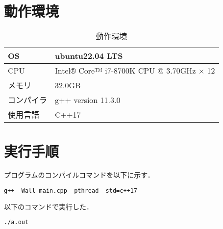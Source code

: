 \documentclass[a4paper,dvipdfmx]{jsarticle}
\begin{document}
\section{動作環境}
    \begin{table}[hbtp]
        \caption{動作環境}
        \label{table:env}
        \centering
        \begin{tabular}{|l|l|}
        \hline \hline
        OS  & ubuntu22.04 LTS\\\hline
        CPU  & Intel® Core™ i7-8700K CPU @ 3.70GHz × 12\\\hline
        メモリ  & 32.0GB \\\hline
        コンパイラ  &  g++ version 11.3.0\\\hline
        使用言語  &  C++17\\
        \hline \hline
        \end{tabular}
    \end{table}

\section{実行手順}
    プログラムのコンパイルコマンドを以下に示す．
    \begin{lstlisting}[caption=コンパイル,label=build]
        g++ -Wall main.cpp -pthread -std=c++17
    \end{lstlisting}\par
    以下のコマンドで実行した．
    \begin{lstlisting}[caption=実行コマンド,label=run]
        ./a.out
    \end{lstlisting}

\end{document}
